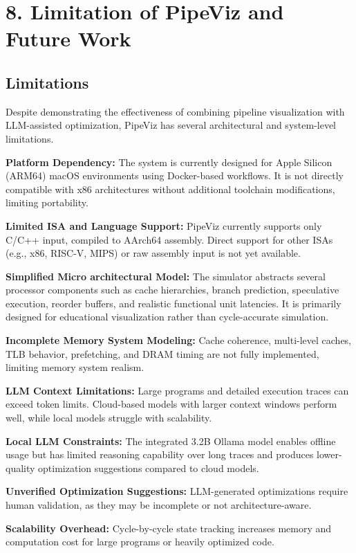\section*{8. Limitation of PipeViz and Future Work}

\subsection*{Limitations}

Despite demonstrating the effectiveness of combining pipeline visualization with LLM-assisted optimization, PipeViz has several architectural and system-level limitations.

\textbf{Platform Dependency:} The system is currently designed for Apple Silicon (ARM64) macOS environments using Docker-based workflows. It is not directly compatible with x86 architectures without additional toolchain modifications, limiting portability.

\textbf{Limited ISA and Language Support:} PipeViz currently supports only C/C++ input, compiled to AArch64 assembly. Direct support for other ISAs (e.g., x86, RISC-V, MIPS) or raw assembly input is not yet available.

\textbf{Simplified Micro architectural Model:} The simulator abstracts several processor components such as cache hierarchies, branch prediction, speculative execution, reorder buffers, and realistic functional unit latencies. It is primarily designed for educational visualization rather than cycle-accurate simulation.

\textbf{Incomplete Memory System Modeling:} Cache coherence, multi-level caches, TLB behavior, prefetching, and DRAM timing are not fully implemented, limiting memory system realism.

\textbf{LLM Context Limitations:} Large programs and detailed execution traces can exceed token limits. Cloud-based models with larger context windows perform well, while local models struggle with scalability.

\textbf{Local LLM Constraints:} The integrated 3.2B Ollama model enables offline usage but has limited reasoning capability over long traces and produces lower-quality optimization suggestions compared to cloud models.

\textbf{Unverified Optimization Suggestions:} LLM-generated optimizations require human validation, as they may be incomplete or not architecture-aware.

\textbf{Scalability Overhead:} Cycle-by-cycle state tracking increases memory and computation cost for large programs or heavily optimized code.

